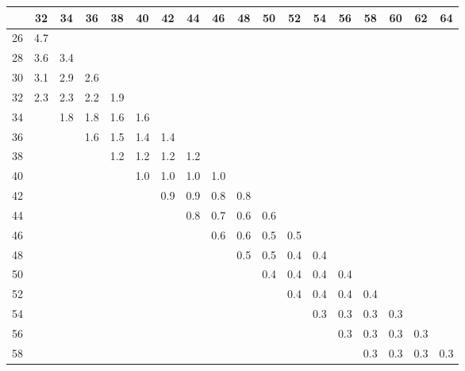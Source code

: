 \begin{table}
\begin{table}
\begin{center}
\begin{tabular}{|l|ccccccccccccccccc|}\hline 
   & 32 & 34 & 36 & 38 & 40 & 42 & 44 & 46 & 48 & 50 & 52 & 54 & 56 & 58 & 60 & 62 & 64 \\ \hline
26 &  4.7  &    &    &    &    &    &    &    &    &    &    &    &    &    &    &    &   \\   
28 &  3.6  & 3.4   &    &    &    &    &    &    &    &    &    &    &    &    &    &    &   \\   
30 & 3.1   & 2.9   & 2.6   &    &    &    &    &    &    &    &    &    &    &    &    &    &   \\
32 &  2.3  & 2.3   & 2.2   &  1.9  &   &    &    &    &    &    &    &    &    &    &    &    &   \\
34 &    & 1.8   & 1.8   & 1.6   & 1.6   &    &    &    &    &    &    &    &    &    &    &    &   \\
36 &    &    & 1.6   & 1.5   & 1.4   & 1.4   &    &    &    &    &    &    &    &    &    &    &   \\
38 &    &    &    & 1.2   &  1.2  & 1.2   &  1.2  &    &    &    &    &    &    &    &    &    &   \\
40 &    &    &    &    & 1.0   &  1.0  & 1.0   & 1.0   &    &    &    &    &    &    &    &    &   \\
42 &    &    &    &    &    & 0.9   & 0.9   & 0.8   & 0.8   &    &    &    &    &    &    &    &   \\
44 &    &    &    &    &    &    & 0.8   & 0.7   & 0.6   &  0.6  &    &    &    &    &    &    &    \\
46 &    &    &    &    &    &    &    & 0.6   & 0.6   & 0.5   & 0.5   &    &    &    &    &    &   \\
48 &    &    &    &    &    &    &    &    & 0.5   & 0.5   & 0.4   & 0.4   &    &    &    &    &    \\
50 &    &    &    &    &    &    &    &    &    & 0.4   & 0.4   & 0.4   & 0.4   &    &    &    &   \\
52 &    &    &    &    &    &    &    &    &    &    & 0.4   & 0.4   & 0.4   & 0.4   &    &    &   \\
54 &    &    &    &    &    &    &    &    &    &    &    & 0.3   & 0.3   & 0.3   & 0.3   &    &    \\
56 &    &    &    &    &    &    &    &    &    &    &    &    & 0.3   & 0.3   & 0.3   &  0.3  &   \\
58 &    &    &    &    &    &    &    &    &    &    &    &    &    & 0.3   & 0.3   & 0.3   & 0.3  \\

\end{tabular}
\end{center}
\end{table}
\end{table}
